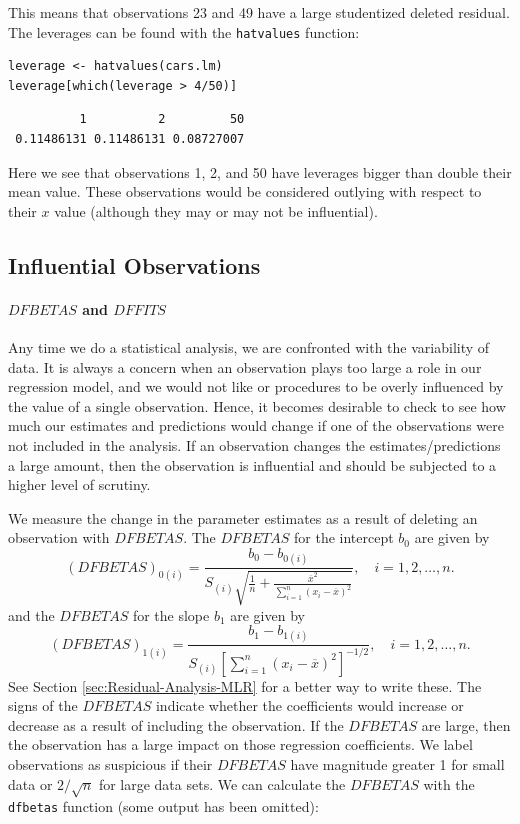 \documentclass[captions=tableheading]{scrbook}
\begin{document}
This means that observations 23 and 49 have a large studentized deleted residual. The leverages can be found with the \texttt{hatvalues} function:


\begin{verbatim}
leverage <- hatvalues(cars.lm)
leverage[which(leverage > 4/50)]
\end{verbatim}

\begin{verbatim}
          1          2         50 
 0.11486131 0.11486131 0.08727007
\end{verbatim}

Here we see that observations 1, 2, and 50 have leverages bigger than double their mean value. These observations would be considered outlying with respect to their \(x\) value (although they may or may not be influential).
\subsection{Influential Observations}
\label{sec-1-5-4}


\paragraph*{\(DFBETAS\) and \(DFFITS\)}

Any time we do a statistical analysis, we are confronted with the variability of data. It is always a concern when an observation plays too large a role in our regression model, and we would not like or procedures to be overly influenced by the value of a single observation. Hence, it becomes desirable to check to see how much our estimates and predictions would change if one of the observations were not included in the analysis. If an observation changes the estimates/predictions a large amount, then the observation is influential and should be subjected to a higher level of scrutiny.

We measure the change in the parameter estimates as a result of deleting an observation with \(DFBETAS\). The \(DFBETAS\) for the intercept \(b_{0}\) are given by
\begin{equation}
(DFBETAS)_{0(i)}=\frac{b_{0}-b_{0(i)}}{S_{(i)}\sqrt{\frac{1}{n}+\frac{\overline{x}^{2}}{\sum_{i=1}^{n}(x_{i}-\overline{x})^{2}}}},\quad i=1,2,\ldots,n.
\end{equation}
and the \(DFBETAS\) for the slope \(b_{1}\) are given by
\begin{equation}
(DFBETAS)_{1(i)}=\frac{b_{1}-b_{1(i)}}{S_{(i)}\left[\sum_{i=1}^{n}(x_{i}-\overline{x})^{2}\right]^{-1/2}},\quad i=1,2,\ldots,n.
\end{equation}
See Section \ref{sec:Residual-Analysis-MLR} for a better way to write these. The signs of the \(DFBETAS\) indicate whether the coefficients would increase or decrease as a result of including the observation. If the \(DFBETAS\) are large, then the observation has a large impact on those regression coefficients. We label observations as suspicious if their \(DFBETAS\) have magnitude greater 1 for small data or \(2/\sqrt{n}\) for large data sets.
We can calculate the \(DFBETAS\) with the \texttt{dfbetas} function (some output has been omitted):
\end{document}

